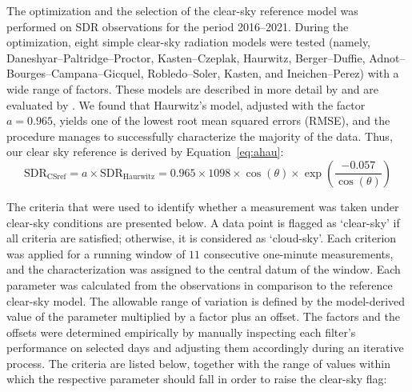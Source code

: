 \documentclass[applsci,article,accept,moreauthors,pdftex]{Definitions/mdpi}
\begin{document}
The optimization and the selection of the clear-sky reference model was
performed on SDR observations for the period 2016--2021. During the
optimization, eight simple clear-sky radiation models were tested
(namely, Daneshyar--Paltridge--Proctor, Kasten--Czeplak, Haurwitz,
Berger--Duffie, Adnot--Bourges--Campana--Gicquel, Robledo--Soler, Kasten, and
Ineichen--Perez) with a wide range of factors. These models are
described in more detail by \citet{Reno2012} and are evaluated by
\citet{Reno2016}. We found that Haurwitz's model, adjusted with the
factor \(a = 0.965\), yields one of the lowest root mean squared errors
(RMSE), and the procedure manages to successfully characterize the
majority of the data. Thus, our clear sky reference is derived by
Equation~\eqref{eq:ahau}: \begin{equation}
\text{SDR}_\text{CSref} = a \times \text{SDR}_\text{Haurwitz} = 0.965 \times 1098 \times \cos(\theta) \times \exp \left( \frac{ - 0.057}{\cos(\theta)} \right) \label{eq:ahau}
\end{equation}

The criteria that were used to identify whether a measurement was taken
under clear-sky conditions are presented below. A data point is flagged
as `clear-sky' if all criteria are satisfied; otherwise, it is
considered as `cloud-sky'. Each criterion was applied for a running
window of \(11\) consecutive one-minute measurements, and the
characterization was assigned to the central datum of the window. Each
parameter was calculated from the observations in comparison to the
reference clear-sky model. The allowable range of variation is defined
by the model-derived value of the parameter multiplied by a factor plus
an offset. The factors and the offsets were determined empirically by
manually inspecting each filter's performance on selected days and
adjusting them accordingly during an iterative process. The criteria are
listed below, together with the range of values within which the
respective parameter should fall in order to raise the clear-sky flag:
\end{document}
